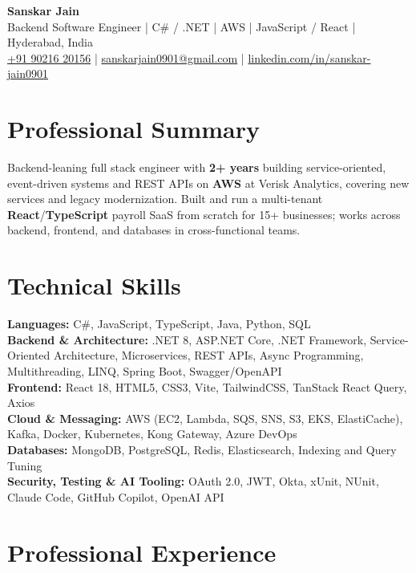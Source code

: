 \documentclass[letterpaper,10pt]{article}
\begin{document}
\begin{center}
    {\LARGE \textbf{Sanskar Jain}} \\
    Backend Software Engineer \;|\; C\# / .NET \;|\; AWS \;|\; JavaScript / React \;|\; Hyderabad, India \\
    \href{tel:+919021620156}{+91 90216 20156} \;|\;
    \href{mailto:sanskarjain0901@gmail.com}{sanskarjain0901@gmail.com} \;|\;
    \href{https://www.linkedin.com/in/sanskar-jain0901/}{linkedin.com/in/sanskar-jain0901}
\end{center}

\section*{Professional Summary}
Backend-leaning full stack engineer with \textbf{2+ years} building service-oriented, event-driven systems and REST APIs on \textbf{AWS} at Verisk Analytics, covering new services and legacy modernization. Built and run a multi-tenant \textbf{React}/\textbf{TypeScript} payroll SaaS from scratch for 15+ businesses; works across backend, frontend, and databases in cross-functional teams.

\section*{Technical Skills}
\begin{sloppypar}
\noindent
\textbf{Languages:} C\#, JavaScript, TypeScript, Java, Python, SQL \\
\textbf{Backend \& Architecture:} .NET 8, ASP.NET Core, .NET Framework, Service-Oriented Architecture, Microservices, REST APIs, Async Programming, Multithreading, LINQ, Spring Boot, Swagger/OpenAPI \\
\textbf{Frontend:} React 18, HTML5, CSS3, Vite, TailwindCSS, TanStack React Query, Axios \\
\textbf{Cloud \& Messaging:} AWS (EC2, Lambda, SQS, SNS, S3, EKS, ElastiCache), Kafka, Docker, Kubernetes, Kong Gateway, Azure DevOps \\
\textbf{Databases:} MongoDB, PostgreSQL, Redis, Elasticsearch, Indexing and Query Tuning \\
\textbf{Security, Testing \& AI Tooling:} OAuth 2.0, JWT, Okta, xUnit, NUnit, Claude Code, GitHub Copilot, OpenAI API
\end{sloppypar}

\section*{Professional Experience}
\end{document}
